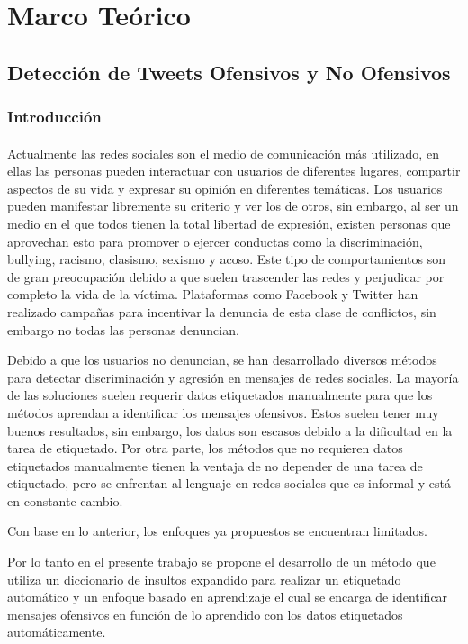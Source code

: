 \documentclass{article}
\begin{document}
\clearpage
\section{Marco Teórico}
\subsection{Detección de Tweets Ofensivos y No Ofensivos}

\subsubsection{Introducción}
\paragraph{}
Actualmente las redes sociales son el medio de comunicación más utilizado, en ellas las personas pueden interactuar con usuarios de diferentes lugares, compartir aspectos de su vida y expresar su opinión en diferentes temáticas. Los usuarios pueden manifestar libremente su criterio y ver los de otros, sin embargo, al ser un medio en el que todos tienen la total libertad de expresión, existen personas que aprovechan esto para promover o ejercer conductas como la discriminación, bullying, racismo, clasismo, sexismo y acoso. Este tipo de comportamientos son de gran preocupación debido a que suelen trascender las redes y perjudicar por completo la vida de la víctima. Plataformas como Facebook y Twitter han realizado campañas para incentivar la denuncia de esta clase de conflictos, sin embargo no todas las personas denuncian.

Debido a que los usuarios no denuncian, se han desarrollado diversos métodos para detectar discriminación y agresión en mensajes de redes sociales. La mayoría de las soluciones suelen requerir datos etiquetados manualmente para que los métodos aprendan a identificar los mensajes ofensivos. Estos suelen tener muy buenos resultados, sin embargo, los datos son escasos debido a la dificultad en la tarea de etiquetado. Por otra parte, los métodos que no requieren datos etiquetados manualmente tienen la ventaja de no depender de una tarea de etiquetado, pero se enfrentan al lenguaje en redes sociales que es informal y está en constante cambio.

Con base en lo anterior, los enfoques ya propuestos se encuentran limitados.

Por lo tanto en el presente trabajo se propone el desarrollo de un método que utiliza un diccionario de insultos expandido para realizar un etiquetado automático y un enfoque basado en aprendizaje el cual se encarga de identificar mensajes ofensivos en función de lo aprendido con los datos etiquetados automáticamente.
\end{document}
